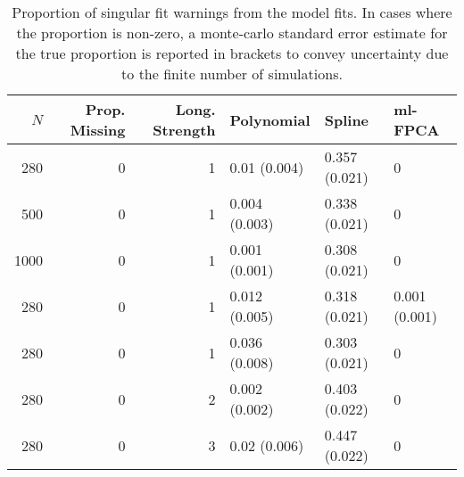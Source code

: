 \begin{table}[ht]
\centering
\begin{tabular}{rrrlll}
  \toprule
{\bfseries \small $N$} & {\bfseries \small Prop. Missing} & {\bfseries \small Long. Strength} & {\bfseries \small Polynomial} & {\bfseries \small Spline} & {\bfseries \small ml-FPCA} \\ 
  \midrule
280 & 0 & 1 & 0.01 (0.004) & 0.357 (0.021) & 0 \\ 
  500 & 0 & 1 & 0.004 (0.003) & 0.338 (0.021) & 0 \\ 
  1000 & 0 & 1 & 0.001 (0.001) & 0.308 (0.021) & 0 \\ 
  280 & 0 & 1 & 0.012 (0.005) & 0.318 (0.021) & 0.001 (0.001) \\ 
  280 & 0 & 1 & 0.036 (0.008) & 0.303 (0.021) & 0 \\ 
  280 & 0 & 2 & 0.002 (0.002) & 0.403 (0.022) & 0 \\ 
  280 & 0 & 3 & 0.02 (0.006) & 0.447 (0.022) & 0 \\ 
   \bottomrule
\end{tabular}
\caption{Proportion of singular fit warnings from the model fits. In cases where the proportion is non-zero, a monte-carlo standard error estimate for the true proportion is reported in brackets to convey uncertainty due to the finite number of simulations.} 
\label{tab:singularity-table}
\end{table}
